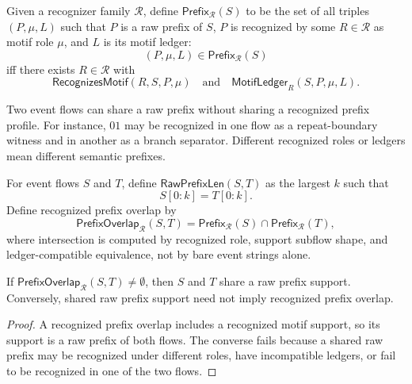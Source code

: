 \begin{definition}
\label{def:metrics-recognized-prefix-profile}
Given a recognizer family $\mathcal R$, define $\mathsf{Prefix}_{\mathcal R}(S)$ to be the set of all triples $(P,\mu,L)$ such that $P$ is a raw prefix of $S$, $P$ is recognized by some $R\in\mathcal R$ as motif role $\mu$, and $L$ is its motif ledger:
$$
  (P,\mu,L)\in\mathsf{Prefix}_{\mathcal R}(S)
$$
iff there exists $R\in\mathcal R$ with
$$
  \mathsf{RecognizesMotif}(R,S,P,\mu)
  \quad\text{and}\quad
  \mathsf{MotifLedger}_{R}(S,P,\mu,L).
$$
\end{definition}

\begin{remark}
\label{rem:metrics-raw-prefix-semantic-prefix-differ}
Two event flows can share a raw prefix without sharing a recognized prefix profile. For instance, $01$ may be recognized in one flow as a repeat-boundary witness and in another as a branch separator. Different recognized roles or ledgers mean different semantic prefixes.
\end{remark}

\begin{definition}
\label{def:metrics-prefix-overlap-length}
For event flows $S$ and $T$, define $\mathsf{RawPrefixLen}(S,T)$ as the largest $k$ such that
$$
  S[0:k]=T[0:k].
$$
Define recognized prefix overlap by
$$
  \mathsf{PrefixOverlap}_{\mathcal R}(S,T)
  =
  \mathsf{Prefix}_{\mathcal R}(S)
  \cap
  \mathsf{Prefix}_{\mathcal R}(T),
$$
where intersection is computed by recognized role, support subflow shape, and ledger-compatible equivalence, not by bare event strings alone.
\end{definition}

\begin{proposition}
\label{prop:metrics-raw-prefix-weaker}
If $\mathsf{PrefixOverlap}_{\mathcal R}(S,T)\neq\emptyset$, then $S$ and $T$ share a raw prefix support. Conversely, shared raw prefix support need not imply recognized prefix overlap.
\end{proposition}

\begin{proof}
A recognized prefix overlap includes a recognized motif support, so its support is a raw prefix of both flows. The converse fails because a shared raw prefix may be recognized under different roles, have incompatible ledgers, or fail to be recognized in one of the two flows.
\end{proof}

